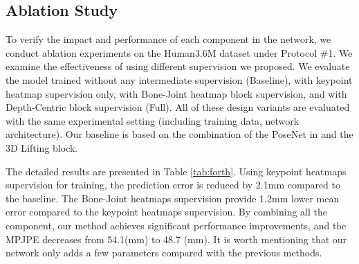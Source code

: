 \documentclass[letterpaper]{article} \usepackage{aaai21}  \usepackage{times}  \usepackage{helvet} \usepackage{courier}  \usepackage[hyphens]{url}  \usepackage{graphicx} \urlstyle{rm} \def\UrlFont{\rm}  \usepackage{natbib}  \usepackage{caption} \frenchspacing  \setlength{\pdfpagewidth}{8.5in}  \setlength{\pdfpageheight}{11in}
\begin{document}
 

\subsection{Ablation Study}

To verify the impact and performance of each component in the network, we conduct ablation experiments on the Human3.6M dataset under Protocol \#1. We examine the effectiveness of using different supervision we proposed. We evaluate the model trained without any intermediate supervision (Baseline), with keypoint heatmap supervision only, with Bone-Joint heatmap block supervision, and with Depth-Centric block supervision (Full). All of these design variants are evaluated with the same experimental setting (including training data, network architecture). Our baseline is based on the combination of the PoseNet in \cite{moon2019camera} and the 3D Lifting block.

The detailed results are presented in Table \ref{tab:forth}. Using keypoint heatmaps supervision for training, the prediction error is reduced by 2.1mm compared to the baseline. The Bone-Joint heatmaps supervision provide 1.2mm lower mean error compared to the keypoint heatmaps supervision. By combining all the component, our method achieves significant performance improvements, and the MPJPE decreases from 54.1(mm) to 48.7 (mm). It is worth mentioning that our network only adds a few parameters compared with the previous methods.



\begin{table}[htbp]
  \centering
  \small{
  }\caption{Ablative study on the effects of the intermediate supervision we proposed. The evaluation is performed on Human3.6M under Protocol \#1 with MPJPE(mm). JH: joint heatmap, BH: bone heatmap, BJ:bone-joint block, DC: depth-centric block.}
  \label{tab:forth}\end{table}
\end{document}
